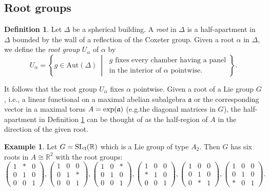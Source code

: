 \documentclass[letterpaper, reqno, 11pt]{amsart}
\theoremstyle{definition}
\newtheorem{definition}[theorem]{Definition}
\newtheorem{example}[theorem]{Example}
\theoremstyle{definition}
\theoremstyle{remark}
\newcommand{\al}{\alpha}
\begin{document}
\subsection{Root groups} 

\begin{definition} \label{root}
    Let \(\Delta\) be a spherical building.
    A \emph{root} in \(\Delta\) is a half-apartment in \(\Delta\) bounded by the wall of a reflection of the Coxeter group.
    Given a root \(\alpha\) in \(\Delta\), 
    we define the \emph{root group} \(U_{\alpha}\) of \(\alpha\) by
      \[
    U_{\alpha} = \left\{ g \in \mathrm{Aut}(\Delta) \ \middle| \
    \begin{array}{l}
    g \text{ fixes every chamber having a panel} \\
    \text{in the interior of } \alpha \text{ pointwise}.
    \end{array}
    \right\}.
    \]
\end{definition}




It follows that the root group $U_{\al}$ fixes $\al$ pointwise.
Given a root of a Lie group $G$, i.e., a linear functional on a maximal abelian subalgebra $\mathfrak{a}$ or the corresponding vector in a maximal torus $A=\rm{exp}(\mathfrak{a})$ (e.g.\@ the diagonal matrices in $G$), the half-apartment in Definition \ref{root} can be thought of as the half-region of $A$ in the direction of the given root.




\begin{example}\label{root gp}
    Let $G=\rm{SL}_3(\mathbb{R})$ which is a Lie group of type $A_2$.
    Then $G$ has six roots in $A \cong \mathbb{R}^2$ with the root groups:
    $$
    \begin{pmatrix} 1 & * & 0\\ 0 & 1 &0 \\ 0& 0& 1\end{pmatrix}, 
    \begin{pmatrix} 1 & 0 & 0\\ 0 & 1 &* \\ 0& 0& 1\end{pmatrix},
    \begin{pmatrix} 1 & 0 & *\\ 0 & 1 &0 \\ 0& 0& 1\end{pmatrix},
    \begin{pmatrix} 1 & 0 & 0\\ * & 1 &0 \\ 0& 0& 1\end{pmatrix},
    \begin{pmatrix} 1 & 0 & 0\\ 0 & 1 &0 \\ 0& *& 1\end{pmatrix},
    \begin{pmatrix} 1 & 0 & 0\\ 0 & 1 &0 \\ *& 0& 1\end{pmatrix}.
    $$

\end{example}
\end{document}
